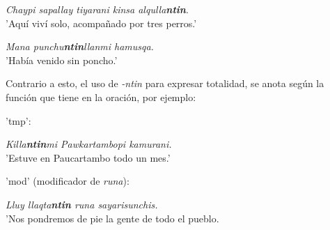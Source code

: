 \documentclass[a4paper,11pt,DIV12]{scrartcl}
\begin{document}
\begin{examples}
 \item\label{Ex:ntin} {\em Chaypi sapallay tiyarani kinsa alqulla\textbf{ntin}}. \\
      'Aquí viví solo, acompañado por tres perros.'\\
           	        \hfill{\small \citep{Valderrama77}}
 \item {\em Mana punchu\textbf{ntin}llanmi hamusqa.}\\	
      'Hab\'ia venido sin poncho.'\\
             	        \hfill{\small \citep[219]{Cusi2}}
\end{examples}

Contrario a esto, el uso de {\em -ntin} para expresar totalidad, se anota seg\'un la funci\'on que tiene en la oraci\'on, por ejemplo:

\begin{examples}
 \item[] 'tmp':
 \item {\em Killa\textbf{ntin}mi Pawkartambopi kamurani.}\\
      'Estuve en Paucartambo todo un mes.'
\item[] 'mod' (modificador de {\em runa}):
 \item {\em Lluy llaqta\textbf{ntin} runa sayarisunchis.}\\
	'Nos pondremos de pie la gente de todo el pueblo.\\
             	        \hfill{\small \citep[219]{Cusi2}}
\end{examples}
\end{document}
